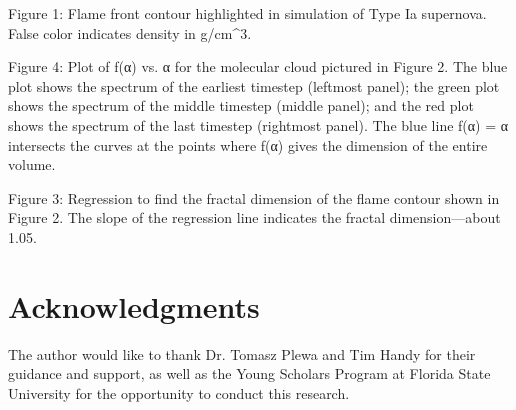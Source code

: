 \documentclass[iop]{emulateapj}
\begin{document}
	Figure 1: Flame front contour highlighted in simulation of Type Ia supernova. False color indicates density in g/cm^3.

	Figure 4: Plot of f(α) vs. α for the molecular cloud pictured in Figure 2. The blue plot shows the spectrum of the earliest timestep (leftmost panel); the green plot shows the spectrum of the middle timestep (middle panel); and the red plot shows the spectrum of the last timestep (rightmost panel). The blue line f(α) = α intersects the curves at the points where f(α) gives the dimension of the entire volume.

	Figure 3: Regression to find the fractal dimension of the flame contour shown in Figure 2. The slope of the regression line indicates the fractal dimension—about 1.05.

\section{Acknowledgments}\label{s:ack}
The author would like to thank Dr. Tomasz Plewa and Tim Handy for their guidance and support, as well as the Young Scholars Program at Florida State University for the opportunity to conduct this research.
%
%


%
%
%
\end{document}
